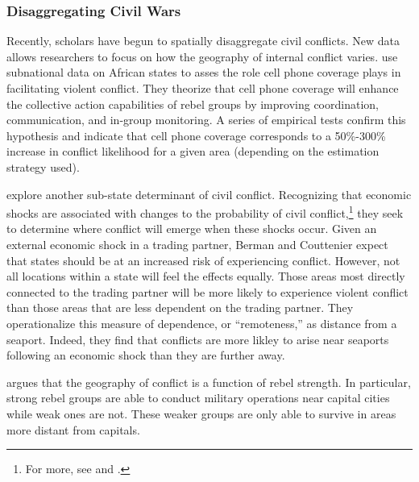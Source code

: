 \subsubsection{Disaggregating Civil Wars}

Recently, scholars have begun to spatially disaggregate civil conflicts.  New data allows researchers to focus on how the geography of internal conflict varies.  \cite{pierskalla:hollenbach:2013} use subnational data on African states to asses the role cell phone coverage plays in facilitating violent conflict.  They theorize that cell phone coverage will enhance the collective action capabilities of rebel groups by improving coordination, communication, and in-group monitoring.  A series of empirical tests confirm this hypothesis and indicate that cell phone coverage corresponds to a 50\%-300\% increase in conflict likelihood for a given area (depending on the estimation strategy used).

\cite{berman:couttenier:2013} explore another sub-state determinant of civil conflict.  Recognizing that economic shocks are associated with changes to the probability of civil conflict,\footnote{For more, see \cite{miguel:etal:2004} and \cite{dube:vargas:2013}.} they seek to determine where conflict will emerge when these shocks occur.  Given an external economic shock in a trading partner, Berman and Couttenier expect that states should be at an increased risk of experiencing conflict.  However, not all locations within a state will feel the effects equally.  Those areas most directly connected to the trading partner will be more likely to experience violent conflict than those areas that are less dependent on the trading partner.  They operationalize this measure of dependence, or ``remoteness,'' as distance from a seaport.  Indeed, they find that conflicts are more likley to arise near seaports following an economic shock than they are further away.

\cite{buhaug:2010} argues that the geography of conflict is a function of rebel strength.  In particular, strong rebel groups are able to conduct military operations near capital cities while weak ones are not.  These weaker groups are only able to survive in areas more distant from capitals. 
